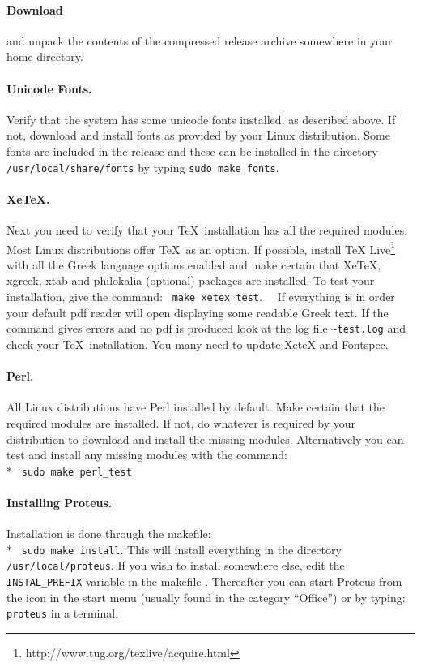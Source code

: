 \documentclass[11pt,a4paper]{article}
\begin{document}
    \paragraph{Download} and unpack the contents of the compressed release
    archive somewhere in your home directory.
    \paragraph{Unicode Fonts.}
      Verify that the system has some unicode fonts installed, as described above.
      If not, download and install fonts as provided by your Linux distribution.
      Some fonts are included in the release and these can be installed in the directory
      {\tt /usr/local/share/fonts} by typing  {\tt sudo make fonts}.
    \paragraph{XeTeX.}
      Next you need to verify that your \TeX\ installation has all the required modules.
      Most Linux distributions offer \TeX\ as an option. If possible, install
      TeX Live\footnote{http://www.tug.org/texlive/acquire.html} with all the
      Greek language options enabled and make certain that XeTeX, xgreek, xtab
      and philokalia (optional) packages are installed.
      To test your installation, give the command:~ {\tt make xetex\_test}.~~
      If everything is in order your default pdf reader will open displaying
      some readable Greek text.  If the command gives errors and no pdf is produced
      look at the log file {\tt \~{}test.log}  and check your
      \TeX\ installation. You many need to update XeteX and Fontspec.
    \paragraph{Perl.}
      All Linux distributions have Perl installed by default.  Make certain that
      the required modules are installed. If not, do whatever is required
      by your distribution to download and install the missing modules.
      Alternatively you can test and install any missing modules with the
      command:\\*  {\tt \hspace*{2cm} sudo make perl\_test}
      \paragraph{Installing Proteus.}
      Installation is done through the makefile:\\*
      {\tt \hspace*{2cm} sudo make install}.\newline
      This will install everything in the directory {\tt /usr/local/proteus}.
      If you wish to install somewhere else, edit the {\tt INSTAL\_PREFIX}
      variable in the makefile .
      Thereafter you can start Proteus from the icon in the start menu
      (usually found in the category ``Office'') or by typing:~ {\tt proteus}
      in a terminal.
\end{document}
